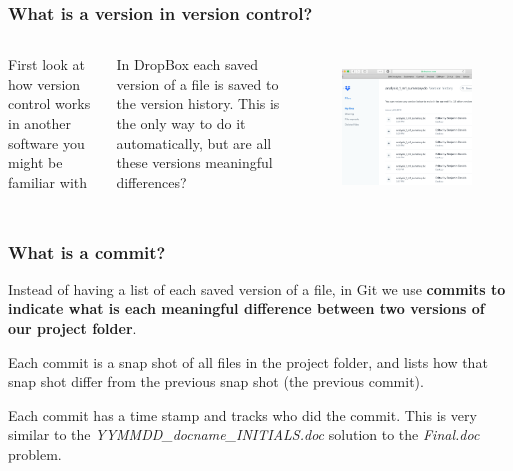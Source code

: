 \documentclass[aspectratio=169]{beamer} %
\begin{document}
\begin{frame}
\frametitle{What is a version in version control?}

	\begin{columns}[c] 
	
		First look at how version control works in another software you might be familiar with
		
		\vspace{.5cm}
		
		In DropBox each saved version of a file is saved to the version history. This is the only way to do it automatically, but are all these versions meaningful differences?
		
		\begin{figure}
			\centering
			\includegraphics[width=1\linewidth]{../../Common-Resources/img/dropbox_versioncontrol}
			\label{fig:dropboxversioncontrol}
		\end{figure}
		
	\end{columns}


\end{frame}

\begin{frame}
\frametitle{What is a commit?}

	Instead of having a list of each saved version of a file, in Git we use \textbf{commits to indicate what is each meaningful difference between two versions of our project folder}. 
	
	\vspace{.25cm}
	
	Each commit is a snap shot of all files in the project folder, and lists how that snap shot differ from the previous snap shot (the previous commit).
	
	\vspace{.25cm}
	
	Each commit has a time stamp and tracks who did the commit. This is very similar to the \textit{YYMMDD\_docname\_INITIALS.doc} solution to the \textit{Final.doc} problem.

\end{frame}
\end{document}
